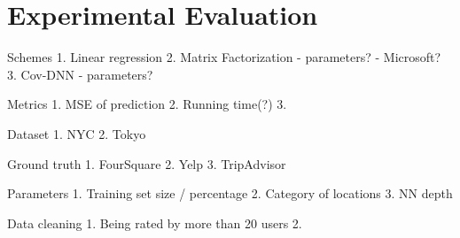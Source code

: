 \section{Experimental Evaluation}\label{sec:exp}

Schemes
1. Linear regression
2. Matrix Factorization - parameters? - Microsoft?
3. Cov-DNN - parameters?

Metrics
1. MSE of prediction
2. Running time(?)
3. 

Dataset
1. NYC
2. Tokyo

Ground truth
1. FourSquare
2. Yelp
3. TripAdvisor

Parameters
1. Training set size / percentage
2. Category of locations
3. NN depth

Data cleaning
1. Being rated by more than 20 users
2. 